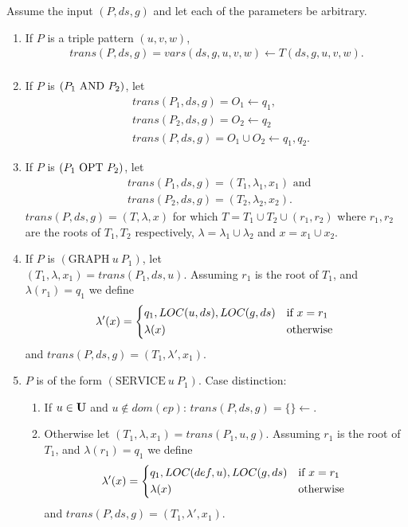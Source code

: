 \bigskip
\noindent
Assume the input $(P,ds,g)$ and let each of the parameters be
arbitrary. 
\begin{enumerate}
	\item If $P$ is a triple pattern $(u,v,w)$,  
		\begin{align*}
		trans(P,ds,g) = vars(ds,g,u,v,w) \leftarrow T(ds,g,u,v,w).\\	
		\end{align*}

	\item If $P$ is $(P_1  \mbox{ AND }  P_2)$, let
		\begin{align*}
			&trans(P_1,ds,g)	= O_1 \leftarrow q_1,\\
			&trans(P_2,ds,g)	= O_2 \leftarrow q_2\\
			&trans(P,ds,g)		= O_1\cup O_2 \leftarrow q_1, q_2.
		\end{align*}
	\item If $P$ is $(P_1  \mbox{ OPT }  P_2)$, let\\
		\begin{align*}
			&trans(P_1,ds,g) =  (T_1, \lambda_1,x_1) \mbox{ and }\\
			&trans(P_2,ds,g) = (T_2, \lambda_2, x_2).
		\end{align*}
		$trans(P,ds,g) = (T,\lambda,x)$ for which $T = T_1 \cup T_2 \cup (r_1,
		r_2)$ where $r_1,r_2$ are the roots of $T_1,T_2$ respectively,
		$\lambda = \lambda_1 \cup \lambda_2$ and $x = x_1 \cup x_2$.

	\item If $P$ is $(\mbox{GRAPH} \ u \ P_1)$, let\\
		$(T_1,\lambda,x_1) = trans(P_1,ds,u)$.	
		Assuming $r_1$ is the root of $T_1$,
		and $\lambda(r_1) = q_1$ we define \[ \lambda'(x) =\begin{dcases*} 
				q_1, LOC(u,ds),LOC(g,ds)& if $x = r_1$\\
				\lambda(x) & otherwise	\\
			\end{dcases*}
		\] and $trans(P,ds,g) = (T_1,\lambda',x_1)$.

	\item $P$ is of the form $(\mbox{SERVICE} \ u \ P_1)$. 
		Case distinction:
		\begin{enumerate}
			\item If $u \in \mathbf{U}$ and $u \notin dom(ep)$:
				$trans(P,ds,g) =  \{\}\leftarrow$.
			\item Otherwise let $(T_1,\lambda,x_1) = trans(P_1,u,g)$.
				Assuming $r_1$ is the root of $T_1$,
				and $\lambda(r_1) = q_1$ we define \[ \lambda'(x) =\begin{dcases*} 
				q_1, LOC(def,u),LOC(g,ds)& if $x = r_1$\\
				\lambda(x) & otherwise	\\
			\end{dcases*}
		\]  and $trans(P,ds,g) = (T_1,\lambda',x_1)$.
		\end{enumerate}


\end{enumerate}
